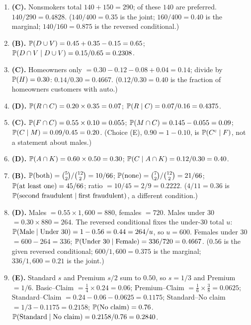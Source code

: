 \begin{enumerate}[label=\arabic*., nosep]
\item \textbf{(C).} Nonsmokers total $140 + 150 = 290$; of these $140$ are preferred.
$140/290 = 0.4828$. ($140/400 = 0.35$ is the joint; $160/400 = 0.40$ is the marginal;
$140/160 = 0.875$ is the reversed conditional.)
\item \textbf{(B).} $\mathbb{P}(D \cup V) = 0.45 + 0.35 - 0.15 = 0.65$;
$\mathbb{P}(D \cap V \mid D \cup V) = 0.15/0.65 = 0.2308$.
\item \textbf{(C).} Homeowners only $= 0.30 - 0.12 - 0.08 + 0.04 = 0.14$;
divide by $\mathbb{P}(H) = 0.30$: $0.14/0.30 = 0.4667$. ($0.12/0.30 = 0.40$ is the
fraction of homeowners customers with auto.)
\item \textbf{(D).} $\mathbb{P}(R \cap C) = 0.20 \times 0.35 = 0.07$;
$\mathbb{P}(R \mid C) = 0.07/0.16 = 0.4375$.
\item \textbf{(C).} $\mathbb{P}(F \cap C) = 0.55 \times 0.10 = 0.055$;
$\mathbb{P}(M \cap C) = 0.145 - 0.055 = 0.09$; $\mathbb{P}(C \mid M) = 0.09/0.45 = 0.20$.
(Choice (E), $0.90 = 1 - 0.10$, is $\mathbb{P}(C^{\mathrm{c}} \mid F)$, not a statement about males.)
\item \textbf{(D).} $\mathbb{P}(A \cap K) = 0.60 \times 0.50 = 0.30$;
$\mathbb{P}(C \mid A \cap K) = 0.12/0.30 = 0.40$.
\item \textbf{(B).} $\mathbb{P}(\text{both}) = \binom{5}{2}/\binom{12}{2} = 10/66$;
$\mathbb{P}(\text{none}) = \binom{7}{2}/\binom{12}{2} = 21/66$;
$\mathbb{P}(\text{at least one}) = 45/66$;
ratio $= 10/45 = 2/9 = 0.2222$. ($4/11 = 0.36$ is $\mathbb{P}(\text{second fraudulent} \mid \text{first fraudulent})$, a different condition.)
\item \textbf{(D).} Males $= 0.55 \times 1{,}600 = 880$, females $= 720$. Males under $30$
$= 0.30 \times 880 = 264$. The reversed conditional fixes the under-$30$ total $u$:
$\mathbb{P}(\text{Male} \mid \text{Under } 30) = 1 - 0.56 = 0.44 = 264/u$, so $u = 600$.
Females under $30$ $= 600 - 264 = 336$; $\mathbb{P}(\text{Under } 30 \mid \text{Female}) = 336/720 = 0.4667$.
($0.56$ is the given reversed conditional; $600/1{,}600 = 0.375$ is the marginal;
$336/1{,}600 = 0.21$ is the joint.)
\item \textbf{(E).} Standard $s$ and Premium $s/2$ sum to $0.50$, so $s = 1/3$ and Premium $= 1/6$.
Basic--Claim $= \tfrac14 \times 0.24 = 0.06$; Premium--Claim $= \tfrac16 \times \tfrac38 = 0.0625$;
Standard--Claim $= 0.24 - 0.06 - 0.0625 = 0.1175$; Standard--No claim $= 1/3 - 0.1175 = 0.2158$;
$\mathbb{P}(\text{No claim}) = 0.76$. $\mathbb{P}(\text{Standard} \mid \text{No claim}) = 0.2158/0.76 = 0.2840$.

\end{enumerate}
